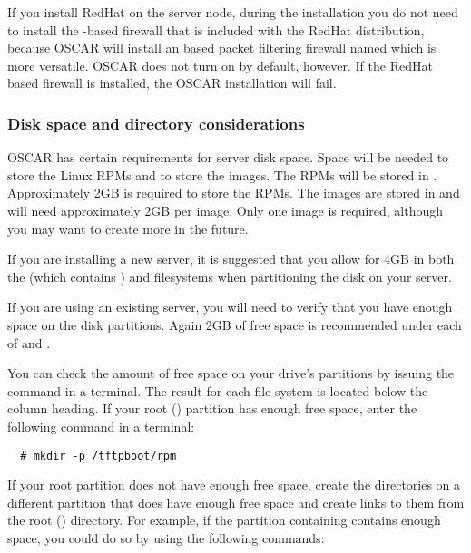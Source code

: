 If you install RedHat on the server node, during the installation you
do not need to install the -based firewall that is
included with the RedHat distribution, because OSCAR will install an
 based packet filtering firewall named
 which is more versatile.  OSCAR does not turn on
 by default, however.  If the RedHat
 based firewall is installed, the OSCAR installation
will fail.

\endchange


\subsubsection{Disk space and directory considerations}
\label{det:serverdiskpar}

OSCAR has certain requirements for server disk space. Space will be
needed to store the Linux RPMs and to store the images.  The RPMs will
be stored in . Approximately 2GB is required to
store the RPMs.  The images are stored in 
and will need approximately 2GB per image. Only one image is required,
although you may want to create more in the future.

If you are installing a new server, it is suggested that you allow for
4GB in both the \file{/} (which contains ) and
 filesystems when partitioning the disk on your server.

If you are using an existing server, you will need to verify that you
have enough space on the disk partitions.  Again 2GB of free space is
recommended under each of \file{/} and .

You can check the amount of free space on your drive's partitions by
issuing the command  in a terminal.  The result for each
file system is located below the  column heading. If your
root (\file{/}) partition has enough free space, enter the following
command in a terminal:

\begin{verbatim}
  # mkdir -p /tftpboot/rpm
\end{verbatim}
  
If your root partition does not have enough free space, create the
directories on a different partition that does have enough free space
and create links to them from the root (\file{/}) directory.  For
example, if the partition containing  contains enough
space, you could do so by using the following commands:

